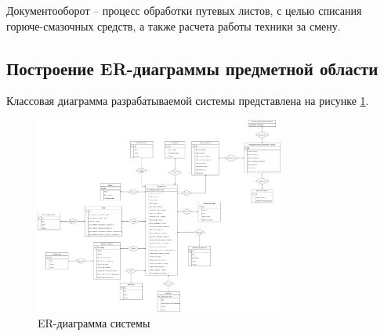 \documentclass[../nirs.tex]{subfiles}
\begin{document}
Документооборот -- процесс обработки путевых листов, с целью списания
горюче-смазочных средств, а также расчета работы техники за смену.

\subsection{Построение ER-диаграммы предметной области}
Классовая диаграмма разрабатываемой системы представлена на рисунке
\ref{fig:2_1_3_er_diagram}.

\begin{figure}
	\centering
	\includegraphics[keepaspectratio,width=0.73\textwidth]{./images/2_1_3_er-diagram.png}
	\caption{ER-диаграмма системы}
	\label{fig:2_1_3_er_diagram}
\end{figure}
\end{document}
